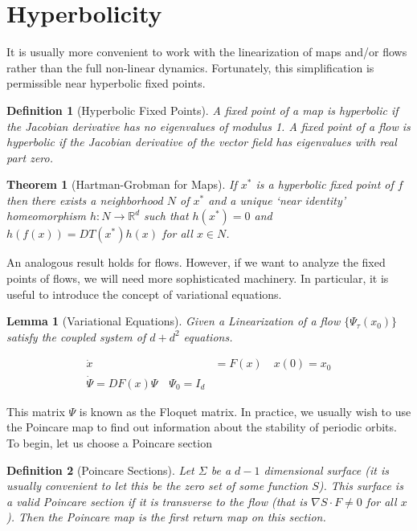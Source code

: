 \documentclass{article}
\newtheorem{theorem}{Theorem}
\newtheorem{lemma}{Lemma}
\newtheorem{definition}{Definition}
\begin{document}
\section*{Hyperbolicity}
It is usually more convenient to work with the linearization of maps and/or flows rather than 
the full non-linear dynamics. Fortunately, this simplification is permissible near hyperbolic 
fixed points. 

\begin{definition}[Hyperbolic Fixed Points]
    A fixed point of a map is hyperbolic if the Jacobian derivative has no eigenvalues 
    of modulus 1. A fixed point of a flow is hyperbolic if the Jacobian derivative of the 
    vector field has eigenvalues with real part zero.
\end{definition}

\begin{theorem}[Hartman-Grobman for Maps]
    If $x^*$ is a hyperbolic fixed point of $f$ then there exists a neighborhood $N$ of $x^*$ 
    and a unique `near identity' homeomorphism $h:N \rightarrow \mathbb{R}^d$ such that $h(x^*) = 0$ 
    and $h(f(x)) = DT(x^*)h(x)$ for all $x \in N$.
\end{theorem}

An analogous result holds for flows. However, if we want to analyze the fixed points of flows, 
we will need more sophisticated machinery. In particular, it is useful to introduce the concept 
of variational equations.

\begin{lemma}[Variational Equations]
    Given a Linearization of a flow $\{\Psi_\tau(x_0)\}$ satisfy the coupled system of $d+d^2$ 
    equations. 

    \begin{align*}
        \dot{x} &=F(x) \quad x(0) = x_0 \\
        \dot{\Psi} = DF(x)\Psi \quad \Psi_0 = I_d
    \end{align*}
\end{lemma}

This matrix $\Psi$ is known as the Floquet matrix. In practice, we usually wish to use the Poincare 
map to find out information about the stability of periodic orbits. To begin, let us choose a 
Poincare section

\begin{definition}[Poincare Sections]
    Let $\Sigma$ be a $d-1$ dimensional surface (it is usually convenient to let this be the 
    zero set of some function $S$). This surface is a valid Poincare section if it is transverse to 
    the flow (that is $\nabla S \cdot F \neq 0$ for all $x$). Then the Poincare map is the first 
    return map on this section.
\end{definition}
\end{document}
